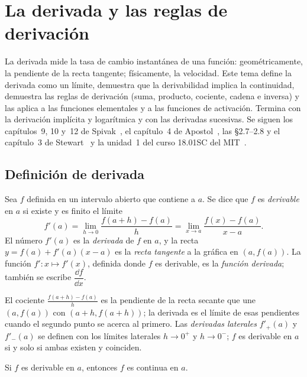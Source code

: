 \chapter{La derivada y las reglas de derivación}
\label{tema:4}

La derivada mide la tasa de cambio instantánea de una función: geométricamente, la pendiente de la recta tangente; físicamente, la velocidad. Este tema define la derivada como un límite, demuestra que la derivabilidad implica la continuidad, demuestra las reglas de derivación (suma, producto, cociente, cadena e inversa) y las aplica a las funciones elementales y a las funciones de activación. Termina con la derivación implícita y logarítmica y con las derivadas sucesivas. Se siguen los capítulos~9, 10 y~12 de Spivak~\cite{spivak}, el capítulo~4 de Apostol~\cite{apostol}, las §2.7--2.8 y el capítulo~3 de Stewart~\cite{stewart} y la unidad~1 del curso 18.01SC del MIT~\cite{mit1801}.

\section{Definición de derivada}

\begin{definicion}[Derivada]\label{def:derivada}
Sea $f$ definida en un intervalo abierto que contiene a $a$. Se dice que $f$ es \emph{derivable} en $a$ si existe y es finito el límite
\[
f'(a)=\lim_{h\to0}\frac{f(a+h)-f(a)}{h}=\lim_{x\to a}\frac{f(x)-f(a)}{x-a}.
\]
El número $f'(a)$ es la \emph{derivada} de $f$ en $a$, y la recta $y=f(a)+f'(a)(x-a)$ es la \emph{recta tangente} a la gráfica en $(a,f(a))$. La función $f'\colon x\mapsto f'(x)$, definida donde $f$ es derivable, es la \emph{función derivada}; también se escribe $\dfrac{\dd f}{\dd x}$.
\end{definicion}

El cociente $\frac{f(a+h)-f(a)}{h}$ es la pendiente de la recta secante que une $(a,f(a))$ con $(a+h,f(a+h))$; la derivada es el límite de esas pendientes cuando el segundo punto se acerca al primero. Las \emph{derivadas laterales} $f'_{+}(a)$ y $f'_{-}(a)$ se definen con los límites laterales $h\to0^{+}$ y $h\to0^{-}$; $f$ es derivable en $a$ si y solo si ambas existen y coinciden.

\addtocounter{definicion}{1}%

\begin{teorema}\label{teo:derivable-continua}
Si $f$ es derivable en $a$, entonces $f$ es continua en $a$.
\end{teorema}

